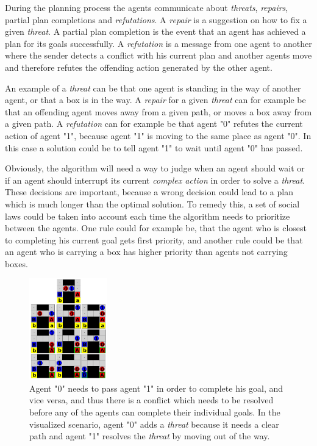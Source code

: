 \documentclass[Main]{subfiles}
\begin{document}
During the planning process the agents communicate about \textit{threats}, \textit{repairs}, partial plan completions and \textit{refutations}.
A \textit{repair} is a suggestion on how to fix a given \textit{threat}.
A partial plan completion is the event that an agent has achieved a plan for its goals successfully.
A \textit{refutation} is a message from one agent to another where the sender detects a conflict with his current plan and another agents move and therefore refutes the offending action generated by the other agent.

An example of a \textit{threat} can be that one agent is standing in the way of another agent, or that a box is in the way.
A \textit{repair} for a given \textit{threat} can for example be that an offending agent moves away from a given path, or moves a box away from a given path.
A \textit{refutation} can for example be that agent "0" refutes the current action of agent "1", because agent "1" is moving to the same place as agent "0". In this case a solution could be to tell agent "1" to wait until agent "0" has passed.

Obviously, the algorithm will need a way to judge when an agent should wait or if an agent should interrupt its current \textit{complex action} in order to solve a \textit{threat}. These decisions are important, because a wrong decision could lead to a plan which is much longer than the optimal solution.
To remedy this, a set of social laws could be taken into account each time the algorithm needs to prioritize between the agents.
One rule could for example be, that the agent who is closest to completing his current goal gets first priority, and another rule could be that an agent who is carrying a box has higher priority than agents not carrying boxes.

\begin{figure}[h!]
	\centering
	\includegraphics[width=0.3\textwidth]{plan_collab.png}
	\caption{Agent "0" needs to pass agent "1" in order to complete his goal, and vice versa, and thus there is a conflict which needs to be resolved before any of the agents can complete their individual goals. In the visualized scenario, agent "0" adds a \textit{threat} because it needs a clear path and agent "1" resolves the \textit{threat} by moving out of the way.}
	\label{fig:plan_collab}
\end{figure}
\end{document}

